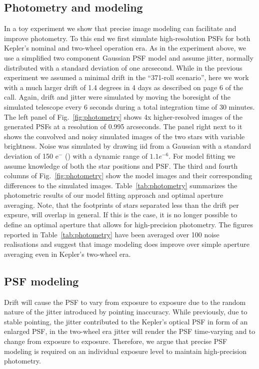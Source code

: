 \documentclass[letterpaper,12pt,whitepaper]{haastex}
\begin{document}
\subsection{Photometry and modeling}\label{sec:photometry}


In a toy experiment we show that precise image modeling can facilitate
and improve photometry. To this end we first simulate high-resolution
PSFs for both Kepler's nominal and two-wheel operation era. As in the
experiment above, we use a simplified two component Gaussian PSF model
and assume jitter, normally distributed with a standard deviation of
one arcsecond. While in the previous experiment we assumed a minimal
drift in the ``371-roll scenario'', here we work with a much larger
drift of 1.4 degrees in 4 days as described on page 6 of the
call. Again, drift and jitter were simulated by moving the boresight
of the simulated telescope every 6 seconds during a total integration
time of 30 minutes. The left panel of Fig.~\ref{fig:photometry} shows
4x higher-resolved images of the generated PSFs at a resolution of
0.995 arcseconds. The panel right next to it shows the convolved and
noisy simulated images of the two stars with variable
brightness. Noise was simulated by drawing iid from a Gaussian with a
standard deviation of 150 e$^-$ (\cite{gilliland2011}) with a dynamic
range of $1.1e^{-6}$. For model fitting we assume knowledge of both the
star positions and PSF. The third and fourth columns of
Fig.~\ref{fig:photometry} show the model images and their
corresponding differences to the simulated
images. Table~\ref{tab:photometry} summarizes the photometric results
of our model fitting approach and optimal aperture averaging. Note,
that the footprints of stars separated less than the drift per
expsure, will overlap in general. If this is the case, it is no longer
possible to define an optimal aperture that allows for high-precision
photometry. The figures reported in Table~\ref{tab:photometry} have
been averaged over 100 noise realisations and suggest that image
modeling does improve over simple aperture averaging even in Kepler's
two-wheel era.


\subsection{PSF modeling}\label{sec:psf}

Drift will cause the PSF to vary from exposure to exposure due to the
random nature of the jitter introduced by pointing inaccuracy. While
previously, due to stable pointing, the jitter contributed to the
Kepler's optical PSF in form of an enlarged PSF, in the two-wheel era
jitter will render the PSF time-varying and to change from exposure to
exposure. Therefore, we argue that precise PSF modeling is required on
an individual exposure level to maintain high-precision photometry.
\end{document}
